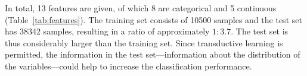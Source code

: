 In total, 13 features are given, of which 8 are categorical and 5 continuous (Table~\ref{tab:features}).
The training set consists of 10500 samples and the test set has 38342 samples, resulting in a ratio of approximately $1:3.7$.
The test set is thus considerably larger than the training set.
Since transductive learning is permitted, the information in the test set---information about the distribution of the variables---could help to increase the classification performance.